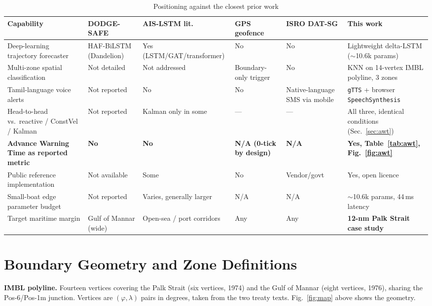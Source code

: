 \documentclass[conference]{IEEEtran}
\begin{document}
\begin{table}[t]
\centering
\caption{Positioning against the closest prior work}
\label{tab:pos}
\small
\begin{tabular}{@{}p{3.6cm}p{2.5cm}p{2.7cm}p{2.3cm}p{2.5cm}p{3.0cm}@{}}
\toprule
\textbf{Capability} & \textbf{DODGE-SAFE \cite{dodgesafe2025}} & \textbf{AIS-LSTM lit.\ \cite{capobianco_fusion2021,zhang2020,gatlstm2023,rocholl2025,lmca2025,nguyen2024}} & \textbf{GPS geofence \cite{ranjith2014,garmin}} & \textbf{ISRO DAT-SG \cite{sacdatsg,dwivedi_navic}} & \textbf{This work} \\
\midrule
Deep-learning trajectory forecaster & HAF-BiLSTM (Dandelion) & Yes (LSTM/GAT/transformer) & No & No & Lightweight delta-LSTM ($\sim$10.6k params) \\
Multi-zone spatial classification & Not detailed & Not addressed & Boundary-only trigger & No & KNN on 14-vertex IMBL polyline, 3 zones \\
Tamil-language voice alerts & Not reported & No & No & Native-language SMS via mobile~\cite{dwivedi_navic} & \texttt{gTTS} + browser \texttt{SpeechSynthesis} \\
Head-to-head vs.\ reactive / ConstVel / Kalman & Not reported & Kalman only in some~\cite{capobianco2021} & --- & --- & All three, identical conditions (Sec.~\ref{sec:awt}) \\
\textbf{Advance Warning Time as reported metric} & \textbf{No} & \textbf{No} & \textbf{N/A (0-tick by design)} & \textbf{N/A} & \textbf{Yes, Table~\ref{tab:awt}, Fig.~\ref{fig:awt}} \\
Public reference implementation & Not available & Some~\cite{capobianco2021} & No & Vendor/govt & Yes, open licence \\
Small-boat edge parameter budget & Not reported & Varies, generally larger & N/A & N/A & $\sim$10.6k params, 44\,ms latency \\
Target maritime margin & Gulf of Mannar (wide) & Open-sea / port corridors & Any & Any & \textbf{12-nm Palk Strait case study} \\
\bottomrule
\end{tabular}
\end{table}

\section{Boundary Geometry and Zone Definitions}\label{sec:geom}

\textbf{IMBL polyline.} Fourteen vertices covering the Palk Strait (six vertices, 1974) and the Gulf of Mannar (eight vertices, 1976), sharing the Pos-6/Pos-1m junction. Vertices are $(\varphi, \lambda)$ pairs in degrees, taken from the two treaty texts. Fig.~\ref{fig:map} above shows the geometry.
\end{document}
